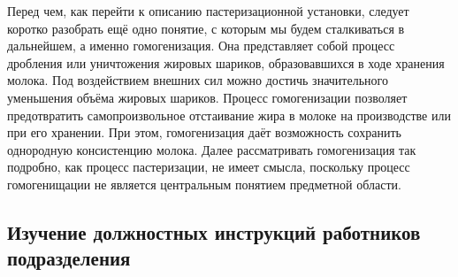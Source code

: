 {  \par \redline 	Перед чем, как перейти к описанию пастеризационной установки, следует коротко разобрать ещё одно понятие, с которым мы будем сталкиваться в дальнейшем, а именно гомогенизация. Она представляет собой процесс дробления или уничтожения жировых шариков, образовавшихся в ходе хранения молока. Под воздействием внешних сил можно достичь значительного уменьшения объёма жировых шариков. Процесс гомогенизации позволяет предотвратить самопроизвольное отстаивание жира в молоке на производстве или при его хранении. При этом, гомогенизация даёт возможность сохранить однородную консистенцию молока. Далее рассматривать гомогенизация так подробно, как процесс пастеризации, не имеет смысла, поскольку процесс гомогенищации не является центральным понятием предметной области. 

  \par
}

\subtitlespace

\subsection*{ 
  \gostTitleFont
   Изучение должностных инструкций работников подразделения
} 

\subtitlespace

